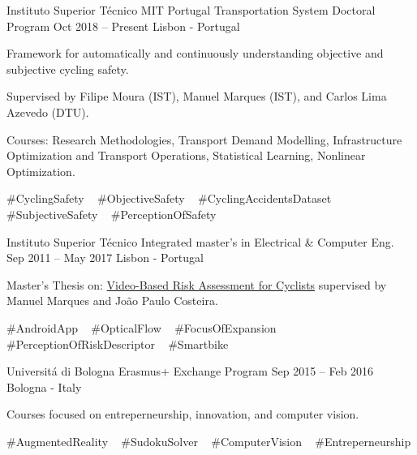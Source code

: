 \begin{cventries}
  \cventry
    {Instituto Superior Técnico} %
    {MIT Portugal Transportation System Doctoral Program} %
    {Oct 2018 – Present} %
    {Lisbon - Portugal} %
    {
      \begin{cvitems} %
        \item {Framework for automatically and continuously understanding objective and subjective cycling safety.}
        \item {Supervised by Filipe Moura (IST), Manuel Marques (IST), and Carlos Lima Azevedo (DTU).}
        \item {Courses: Research Methodologies, Transport Demand Modelling, Infrastructure Optimization and Transport Operations, Statistical Learning, Nonlinear Optimization.}
      \end{cvitems}
    }
    {
      \#CyclingSafety ~
      \#ObjectiveSafety ~
      \#CyclingAccidentsDataset ~
      \#SubjectiveSafety ~
      \#PerceptionOfSafety ~
    }


  \cventry
    {Instituto Superior Técnico} %
    {Integrated master’s in Electrical \& Computer Eng.} %
    {Sep 2011 – May 2017} %
    {Lisbon - Portugal} %
    {
      \begin{cvitems} %
        \item {Master’s Thesis on: \underline{Video-Based Risk Assessment for Cyclists} supervised by Manuel Marques and João Paulo Costeira.}
      \end{cvitems}
    }
    {
      \#AndroidApp ~
      \#OpticalFlow ~
      \#FocusOfExpansion ~
      \#PerceptionOfRiskDescriptor ~
      \#Smartbike ~
    }


  \cventry
    {Universitá di Bologna} %
    {Erasmus+ Exchange Program} %
    {Sep 2015 – Feb 2016} %
    {Bologna - Italy} %
    {
      \begin{cvitems} %
        \item {Courses focused on entreperneurship, innovation, and computer vision.}
      \end{cvitems}
    }
    {
      \#AugmentedReality ~
      \#SudokuSolver ~
      \#ComputerVision ~
      \#Entreperneurship ~
    }

 
 
 
 
 
 
 
 
 
 
 
\end{cventries}
